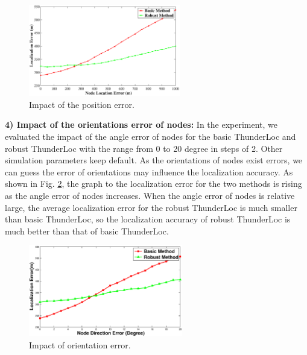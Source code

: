   \begin{figure}[hpt]
            \setlength{\abovecaptionskip}{0pt}
            \centering
            \includegraphics[scale=1.4,height=4.0cm]{image/Location.eps}
     \vspace{2mm}
            \caption{Impact of the position error.}
            \label{Location}
            \vspace{-6mm}
  \end{figure}
  
  \textbf{4) Impact of the orientations error of nodes:}
In the experiment, we evaluated the impact of the angle error of nodes for the basic ThunderLoc and robust ThunderLoc with the range from 0 to 20 degree in steps of 2. 
Other simulation parameters keep default.
As the orientations of nodes exist errors, we can guess the error of orientations may influence the localization accuracy. 
 As shown in Fig. \ref{Direction}, the graph to the localization error for the two methods is rising as the angle error of nodes increases. 
When the angle error of nodes is relative large, the average localization error for the robust ThunderLoc is much smaller than basic ThunderLoc, 
 so the localization accuracy of robust ThunderLoc is much better than that of basic ThunderLoc.
  \begin{figure}[hptb]
            \setlength{\abovecaptionskip}{0pt}
            \centering
            \includegraphics[scale=1.4,height=4.0cm]{image/Direction.eps}
     \vspace{2mm}
            \caption{Impact of orientation error.}
            \label{Direction}
            \vspace{-6mm}
  \end{figure}

